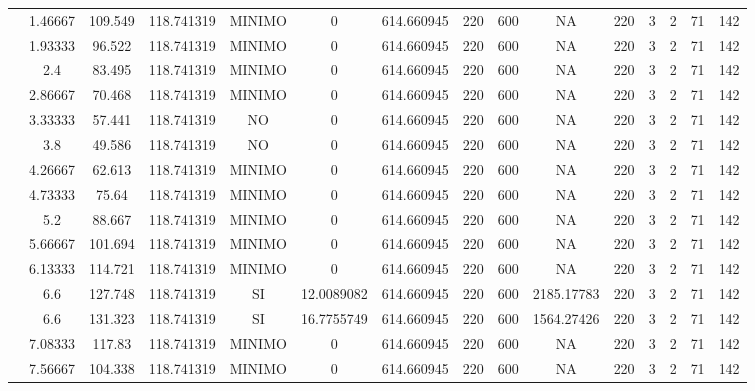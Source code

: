 \begin{table}[H]
{\begin{tabular}{|c|c|c|c|c|c|c|c|c|c|c|c|c|c|c|}
\cline{2-15}    & 1.46667 & 109.549 & 118.741319 & MINIMO & 0   & 614.660945 & 220 & 600 & NA  & 220 & 3   & 2   & 71  & 142 \bigstrut\\
\cline{2-15}    & 1.93333 & 96.522 & 118.741319 & MINIMO & 0   & 614.660945 & 220 & 600 & NA  & 220 & 3   & 2   & 71  & 142 \bigstrut\\
\cline{2-15}    & 2.4 & 83.495 & 118.741319 & MINIMO & 0   & 614.660945 & 220 & 600 & NA  & 220 & 3   & 2   & 71  & 142 \bigstrut\\
\cline{2-15}    & 2.86667 & 70.468 & 118.741319 & MINIMO & 0   & 614.660945 & 220 & 600 & NA  & 220 & 3   & 2   & 71  & 142 \bigstrut\\
\cline{2-15}    & 3.33333 & 57.441 & 118.741319 & NO  & 0   & 614.660945 & 220 & 600 & NA  & 220 & 3   & 2   & 71  & 142 \bigstrut\\
\cline{2-15}    & 3.8 & 49.586 & 118.741319 & NO  & 0   & 614.660945 & 220 & 600 & NA  & 220 & 3   & 2   & 71  & 142 \bigstrut\\
\cline{2-15}    & 4.26667 & 62.613 & 118.741319 & MINIMO & 0   & 614.660945 & 220 & 600 & NA  & 220 & 3   & 2   & 71  & 142 \bigstrut\\
\cline{2-15}    & 4.73333 & 75.64 & 118.741319 & MINIMO & 0   & 614.660945 & 220 & 600 & NA  & 220 & 3   & 2   & 71  & 142 \bigstrut\\
\cline{2-15}    & 5.2 & 88.667 & 118.741319 & MINIMO & 0   & 614.660945 & 220 & 600 & NA  & 220 & 3   & 2   & 71  & 142 \bigstrut\\
\cline{2-15}    & 5.66667 & 101.694 & 118.741319 & MINIMO & 0   & 614.660945 & 220 & 600 & NA  & 220 & 3   & 2   & 71  & 142 \bigstrut\\
\cline{2-15}    & 6.13333 & 114.721 & 118.741319 & MINIMO & 0   & 614.660945 & 220 & 600 & NA  & 220 & 3   & 2   & 71  & 142 \bigstrut\\
\cline{2-15}    & 6.6 & 127.748 & 118.741319 & SI  & 12.0089082 & 614.660945 & 220 & 600 & 2185.17783 & 220 & 3   & 2   & 71  & 142 \bigstrut\\
\cline{2-15}    & 6.6 & 131.323 & 118.741319 & SI  & 16.7755749 & 614.660945 & 220 & 600 & 1564.27426 & 220 & 3   & 2   & 71  & 142 \bigstrut\\
\cline{2-15}    & 7.08333 & 117.83 & 118.741319 & MINIMO & 0   & 614.660945 & 220 & 600 & NA  & 220 & 3   & 2   & 71  & 142 \bigstrut\\
\cline{2-15}    & 7.56667 & 104.338 & 118.741319 & MINIMO & 0   & 614.660945 & 220 & 600 & NA  & 220 & 3   & 2   & 71  & 142 \bigstrut\\

\end{tabular}}
\end{table}
